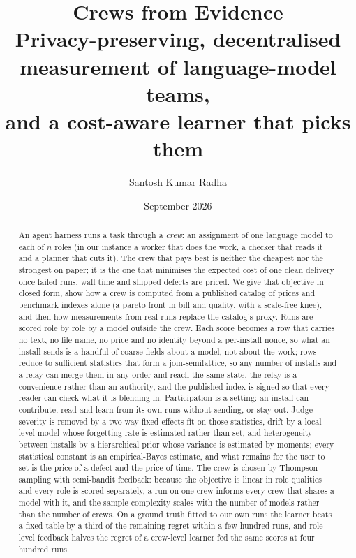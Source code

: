 \documentclass[10pt,a4paper]{article}
\title{\textbf{Crews from Evidence}\\[6pt]
\large Privacy-preserving, decentralised measurement of language-model teams,\\ and a cost-aware learner that picks them}
\author{Santosh Kumar Radha}
\affil{AgentField AI}
\date{September 2026}
\theoremstyle{definition}
\theoremstyle{remark}
\begin{document}
\maketitle
\thispagestyle{fancy}

\begin{abstract}
\noindent
An agent harness runs a task through a \emph{crew}: an assignment of one language model to each of $n$ roles (in our instance a worker that does the work, a checker that reads it and a planner that cuts it). The crew that pays best is neither the cheapest nor the strongest on paper; it is the one that minimises the expected cost of one clean delivery once failed runs, wall time and shipped defects are priced. We give that objective in closed form, show how a crew is computed from a published catalog of prices and benchmark indexes alone (a pareto front in bill and quality, with a scale-free knee), and then how measurements from real runs replace the catalog's proxy. Runs are scored role by role by a model outside the crew. Each score becomes a row that carries no text, no file name, no price and no identity beyond a per-install nonce, so what an install sends is a handful of coarse fields about a model, not about the work; rows reduce to sufficient statistics that form a join-semilattice, so any number of installs and a relay can merge them in any order and reach the same state, the relay is a convenience rather than an authority, and the published index is signed so that every reader can check what it is blending in. Participation is a setting: an install can contribute, read and learn from its own runs without sending, or stay out. Judge severity is removed by a two-way fixed-effects fit on those statistics, drift by a local-level model whose forgetting rate is estimated rather than set, and heterogeneity between installs by a hierarchical prior whose variance is estimated by moments; every statistical constant is an empirical-Bayes estimate, and what remains for the user to set is the price of a defect and the price of time. The crew is chosen by Thompson sampling with semi-bandit feedback: because the objective is linear in role qualities and every role is scored separately, a run on one crew informs every crew that shares a model with it, and the sample complexity scales with the number of models rather than the number of crews. On a ground truth fitted to our own runs the learner beats a fixed table by a third of the remaining regret within a few hundred runs, and role-level feedback halves the regret of a crew-level learner fed the same scores at four hundred runs.
\end{abstract}
\end{document}
